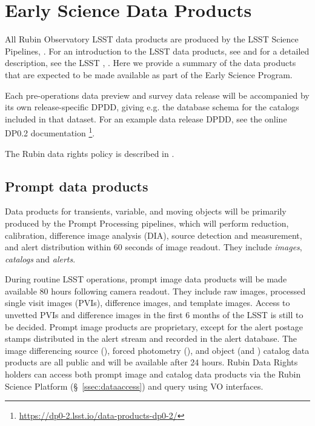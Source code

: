 \section{Early Science Data Products}
\label{sec:data}

All Rubin Observatory LSST data products are produced by the LSST Science Pipelines, \cite{2019ASPC..523..521B,2018PASJ...70S...5B}.
For an introduction to the LSST data products, see \citet{RubinDataProductsAbridged} and for a detailed description, see the LSST \dpdd,  \citet{LSE-163}.
Here we provide a summary of the data products that are expected to be made available as part of the Early Science Program.

Each pre-operations data preview and survey data release will be accompanied by its own release-specific DPDD, giving e.g. the  database schema for the catalogs included in that dataset.
For an example data release DPDD, see the online DP0.2 documentation \footnote{\url{https://dp0-2.lsst.io/data-products-dp0-2/}}.

The Rubin data rights policy is described in  \cite{RDO-013}.

\subsection{Prompt data products}

Data products for transients, variable, and moving objects will be primarily produced by the Prompt Processing pipelines, which will perform reduction, calibration, difference image analysis (DIA), source detection and measurement, and alert distribution within 60 seconds of image readout.
They include \emph{images}, \emph{catalogs} and \emph{alerts}.

During routine LSST operations, prompt image data products will be made available 80 hours following camera readout.
They include raw images, processed single visit images (PVIs), difference images, and template images.
Access to unvetted PVIs and difference images in the first 6 months of the LSST is still to be decided.
Prompt image products are proprietary, except for the alert postage stamps distributed in the alert stream and recorded in the alert database.
The image differencing source (\DIASource), forced photometry (\DIAForcedSource), and object (\DIAObject and \SSObject)
catalog data products are all public and will be available after 24 hours.
Rubin Data Rights holders can access both prompt image and catalog data products via the Rubin Science Platform (\S~\ref{ssec:dataaccess}) and query using VO interfaces.

